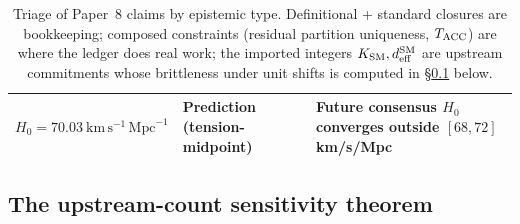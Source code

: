 \documentclass[11pt]{article}
\theoremstyle{plain}
\theoremstyle{definition}
\theoremstyle{remark}
\begin{document}
\begin{table}[h]
\begin{tabularx}{\textwidth}{@{}l l X@{}}
\addlinespace[2pt]
$H_0 = 70.03\ \mathrm{km}\,\mathrm{s}^{-1}\,\mathrm{Mpc}^{-1}$ & \textbf{Prediction (tension-midpoint)} & Future consensus $H_0$ converges outside $[68, 72]$ km/s/Mpc \\
\bottomrule
\end{tabularx}
\caption{Triage of Paper~8 claims by epistemic type.  Definitional + standard closures are bookkeeping; composed constraints (residual partition uniqueness, $T_{\rm ACC}$) are where the ledger does real work; the imported integers $K_{\rm SM}, d_{\rm eff}^{\rm SM}$ are upstream commitments whose brittleness under unit shifts is computed in \S\ref{supp:Iprime2} below.}\label{tab:triage}
\end{table}

\bigskip

\subsection{The upstream-count sensitivity theorem}\label{supp:Iprime2}
\end{document}
